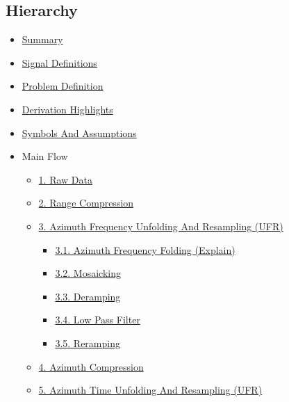 \documentclass[10pt]{article}
\providecommand{\tightlist}{%
  \setlength{\itemsep}{0pt}\setlength{\parskip}{0pt}}
\begin{document}
\hypertarget{hierarchy}{%
\subsection{Hierarchy}\label{hierarchy}}

\begin{itemize}
\tightlist
\item
  \protect\hyperlink{summary}{Summary}
\item
  \protect\hyperlink{signal-definitions}{Signal Definitions}
\item
  \protect\hyperlink{problem-definition}{Problem Definition}
\item
  \protect\hyperlink{derivation-highlights}{Derivation Highlights}
\item
  \protect\hyperlink{symbols-and-assumptions}{Symbols And Assumptions}
\item
  Main Flow

  \begin{itemize}
  \tightlist
  \item
    \protect\hyperlink{1-raw-data}{1. Raw Data}
  \item
    \protect\hyperlink{2-range-compression}{2. Range Compression}
  \item
    \protect\hyperlink{3-azimuth-frequency-unfolding-and-resampling-ufr}{3.
    Azimuth Frequency Unfolding And Resampling (UFR)}

    \begin{itemize}
    \tightlist
    \item
      \protect\hyperlink{31-azimuth-frequency-folding-explain}{3.1.
      Azimuth Frequency Folding (Explain)}
    \item
      \protect\hyperlink{32-mosaicking}{3.2. Mosaicking}
    \item
      \protect\hyperlink{33-deramping}{3.3. Deramping}
    \item
      \protect\hyperlink{34-low-pass-filter}{3.4. Low Pass Filter}
    \item
      \protect\hyperlink{35-reramping}{3.5. Reramping}
    \end{itemize}
  \item
    \protect\hyperlink{4-azimuth-compression}{4. Azimuth Compression}
  \item
    \protect\hyperlink{5-azimuth-time-unfolding-and-resampling-ufr}{5.
    Azimuth Time Unfolding And Resampling (UFR)}


\end{itemize}
\end{itemize}
\end{document}
